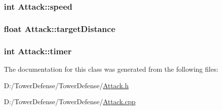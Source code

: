 \hypertarget{class_attack_adffcc8570d6503befe2646836893d466}{
\subsubsection[{speed}]{\setlength{\rightskip}{0pt plus 5cm}int Attack\+::speed\hspace{0.3cm}{\ttfamily [protected]}}}\label{class_attack_adffcc8570d6503befe2646836893d466}
\hypertarget{class_attack_ab318c12d748769f542a45839958a0b3f}{
\subsubsection[{target\+Distance}]{\setlength{\rightskip}{0pt plus 5cm}float Attack\+::target\+Distance\hspace{0.3cm}{\ttfamily [protected]}}}\label{class_attack_ab318c12d748769f542a45839958a0b3f}
\hypertarget{class_attack_aaeda94d2181b4f19f9d6e3f192289d67}{
\subsubsection[{timer}]{\setlength{\rightskip}{0pt plus 5cm}int Attack\+::timer\hspace{0.3cm}{\ttfamily [protected]}}}\label{class_attack_aaeda94d2181b4f19f9d6e3f192289d67}


The documentation for this class was generated from the following files\+:\begin{DoxyCompactItemize}
\item 
D\+:/\+Tower\+Defense/\+Tower\+Defense/\hyperlink{_attack_8h}{Attack.\+h}\item 
D\+:/\+Tower\+Defense/\+Tower\+Defense/\hyperlink{_attack_8cpp}{Attack.\+cpp}\end{DoxyCompactItemize}
